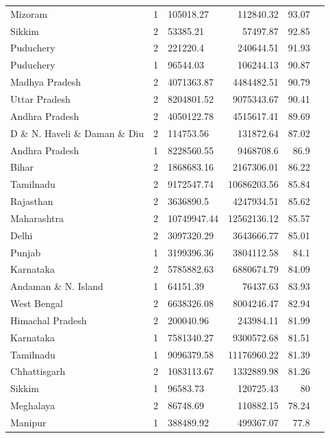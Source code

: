 \documentclass{article}
\begin{document}
\begin{table}[h!]
{\begin{tabular}{|l|l|l|r|r|r|}
		Mizoram              & 1 & 105018.27   & 112840.32   & 93.07 \\
		Sikkim               & 2 & 53385.21    & 57497.87    & 92.85 \\
		Puduchery            & 2 & 221220.4    & 240644.51   & 91.93 \\
		Puduchery            & 1 & 96544.03    & 106244.13   & 90.87 \\
		Madhya Pradesh       & 2 & 4071363.87  & 4484482.51  & 90.79 \\
		Uttar Pradesh        & 2 & 8204801.52  & 9075343.67  & 90.41 \\
		Andhra Pradesh       & 2 & 4050122.78  & 4515617.41  & 89.69 \\
		D \& N. Haveli \& Daman \& Diu & 2      & 114753.56            & 131872.64                   & 87.02             \\
		Andhra Pradesh       & 1 & 8228560.55  & 9468708.6   & 86.9  \\
		Bihar                & 2 & 1868683.16  & 2167306.01  & 86.22 \\
		Tamilnadu            & 2 & 9172547.74  & 10686203.56 & 85.84 \\
		Rajasthan            & 2 & 3636890.5   & 4247934.51  & 85.62 \\
		Maharashtra          & 2 & 10749947.44 & 12562136.12 & 85.57 \\
		Delhi                & 2 & 3097320.29  & 3643666.77  & 85.01 \\
		Punjab               & 1 & 3199396.36  & 3804112.58  & 84.1  \\
		Karnataka            & 2 & 5785882.63  & 6880674.79  & 84.09 \\
		Andaman \& N. Island & 1 & 64151.39    & 76437.63    & 83.93 \\
		West Bengal          & 2 & 6638326.08  & 8004246.47  & 82.94 \\
		Himachal Pradesh     & 2 & 200040.96   & 243984.11   & 81.99 \\
		Karnataka            & 1 & 7581340.27  & 9300572.68  & 81.51 \\
		Tamilnadu            & 1 & 9096379.58  & 11176960.22 & 81.39 \\
		Chhattisgarh         & 2 & 1083113.67  & 1332889.98  & 81.26 \\
		Sikkim               & 1 & 96583.73    & 120725.43   & 80    \\
		Meghalaya            & 2 & 86748.69    & 110882.15   & 78.24 \\
		Manipur              & 1 & 388489.92   & 499367.07   & 77.8  \\

\end{tabular}}
\end{table}
\end{document}
